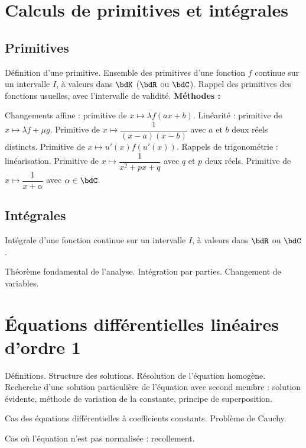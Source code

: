 \documentclass[a4paper,french,bookmarks]{article}
\begin{document}

\section*{Calculs de primitives et intégrales}

\subsection*{Primitives}
Définition d’une primitive. Ensemble des primitives d’une fonction $f$ continue sur un intervalle $I$, à valeurs dans $\bdK$ ($\bdR$ ou $\bdC$). Rappel des primitives des fonctions usuelles, avec l’intervalle de validité. \textbf{Méthodes :}
\begin{enumerate}
    \itarr Changements affine : primitive de $x \mapsto \lambda f(ax + b)$.
    \itarr Linéarité : primitive de $x \mapsto \lambda f + \mu g$.
    \itarr Primitive de $x \mapsto \dfrac{1}{(x-a)(x-b)}$ avec $a$ et $b$ deux réels distincts.
    \itarr Primitive de $x \mapsto u'(x)f(u'(x))$.
    \itarr Rappels de trigonométrie : linéarisation.
    \itarr Primitive de $x \mapsto \dfrac{1}{x^2+px+q}$ avec $q$ et $p$ deux réels.
    \itarr Primitive de $x \mapsto \dfrac{1}{x + \alpha}$ avec $\alpha \in \bdC$.
\end{enumerate}

\subsection*{Intégrales}
Intégrale d’une fonction continue sur un intervalle $I$, à valeurs dans $\bdR$ ou $\bdC$.

Théorème fondamental de l’analyse. Intégration par parties. Changement de variables.

\section*{Équations différentielles linéaires d’ordre 1}

Définitions. Structure des solutions. Résolution de l’équation homogène. Recherche d’une solution particulière de l’équation avec second membre : solution évidente, méthode de variation de la constante, principe
de superposition.

Cas des équations différentielles à coefficients constants. Problème de Cauchy.

Cas où l’équation n’est pas normalisée : recollement.
\end{document}
